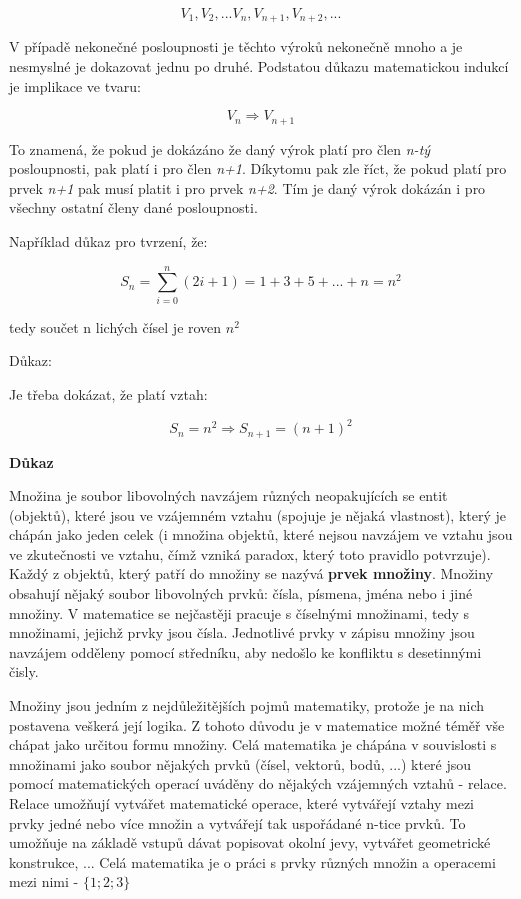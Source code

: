 $$ V_1, V_2, ... V_n, V_{n+1}, V_{n+2}, ... $$

V případě nekonečné posloupnosti je těchto výroků nekonečně mnoho a je nesmyslné je dokazovat jednu po druhé. Podstatou důkazu matematickou indukcí je implikace ve tvaru:

$$ V_n \Rightarrow V_{n+1} $$

To znamená, že pokud je dokázáno že daný výrok platí pro člen {\it n-tý} posloupnosti, pak platí i pro člen {\it n+1}. Díkytomu pak zle říct, že pokud platí pro prvek {\it n+1} pak musí platit i pro prvek {\it n+2}. Tím je daný výrok dokázán i pro všechny ostatní členy dané posloupnosti. 

Například důkaz pro tvrzení, že:

$$ S_n = \sum^n_{i=0} (2i+1) = 1 + 3 + 5 + ... + n = n^2 $$ 

tedy součet n lichých čísel je roven $n^2$

Důkaz:

Je třeba dokázat, že platí vztah:

$$ S_n = n^2 \Rightarrow S_{n+1} = (n+1)^2 $$


{\bf Důkaz} 


Množina je soubor libovolných navzájem různých neopakujících se entit (objektů), které jsou ve vzájemném vztahu (spojuje je nějaká vlastnost), který je chápán jako jeden celek (i množina objektů, které nejsou navzájem ve vztahu jsou ve zkutečnosti ve vztahu, čímž vzniká paradox, který toto pravidlo potvrzuje). Každý z objektů, který patří do množiny se nazývá {\bf prvek množiny}.  Množiny obsahují nějaký soubor libovolných prvků: čísla, písmena, jména nebo i jiné množiny. V matematice se nejčastěji pracuje s číselnými množinami, tedy s množinami, jejichž prvky jsou čísla. Jednotlivé prvky v zápisu množiny jsou navzájem odděleny pomocí středníku, aby nedošlo ke konfliktu s desetinnými čisly.

Množiny jsou jedním z nejdůležitějších pojmů matematiky, protože je na nich postavena veškerá její logika. Z tohoto důvodu je v matematice možné téměř vše chápat jako určitou formu množiny. Celá matematika je chápána v souvislosti s množinami jako soubor nějakých prvků (čísel, vektorů, bodů, ...) které jsou pomocí matematických operací uváděny do nějakých vzájemných vztahů - relace. Relace umožňují vytvářet matematické operace, které vytvářejí vztahy mezi prvky jedné nebo více množin a vytvářejí tak uspořádané n-tice prvků. To umožňuje na základě vstupů dávat popisovat okolní jevy, vytvářet geometrické konstrukce, ... Celá matematika je o práci s prvky různých množin a operacemi mezi nimi - $\{1; 2; 3 \}$


